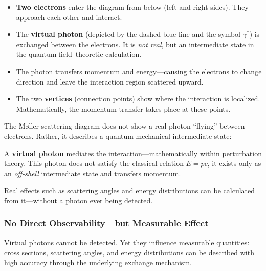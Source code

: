 \begin{itemize}
	\item \textbf{Two electrons} enter the diagram from below (left and right sides). They approach each other and interact.
	
	\item The \textbf{virtual photon} (depicted by the dashed blue line and the symbol $\gamma^*$) is exchanged between the electrons. It is \emph{not real}, but an intermediate state in the quantum field–theoretic calculation.
	
	\item The photon transfers momentum and energy—causing the electrons to change direction and leave the interaction region scattered upward.
	
	\item The two \textbf{vertices} (connection points) show where the interaction is localized. Mathematically, the momentum transfer takes place at these points.
\end{itemize}

\begin{tcolorbox}[didaktikbox, title=What Does the Feynman Diagram Really Show?]
	\label{box:Was zeigt das Feynman-Diagramm wirklich}
	The Møller scattering diagram does not show a real photon “flying” between electrons. Rather, it describes a quantum-mechanical intermediate state:
	
	A \textbf{virtual photon} mediates the interaction—mathematically within perturbation theory. This photon does not satisfy the classical relation $E = pc$, it exists only as an \emph{off-shell} intermediate state and transfers momentum.
	
	Real effects such as scattering angles and energy distributions can be calculated from it—without a photon ever being detected.
\end{tcolorbox}

\subsubsection*{No Direct Observability—but Measurable Effect}
Virtual photons cannot be detected. Yet they influence measurable quantities: cross sections, scattering angles, and energy distributions can be described with high accuracy through the underlying exchange mechanism.


